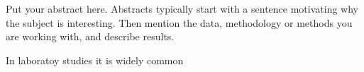 Put your abstract here. Abstracts typically start with a sentence motivating why the subject is interesting. Then mention the data, methodology or methods you are working with, and describe results. 

In laboratoy studies it is widely common